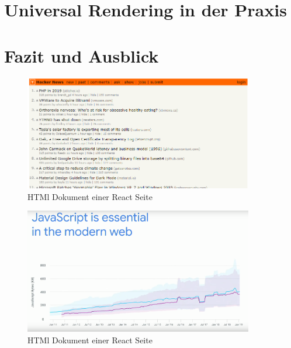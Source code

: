 \documentclass[runningheads]{llncs}
\begin{document}
\newpage

\section{Universal Rendering in der Praxis}
\label{sec:Universal Rendering in der Praxis}

\newpage

\section{Fazit und Ausblick}
\label{sec:Fazit}

\begin{figure}
  \centering
  \includegraphics[width=10cm]{images/HackerNews}
  \caption{HTMl Dokument einer React Seite}
\end{figure}

\begin{figure}
  \centering
  \includegraphics[width=10cm]{images/JavaScriptGoogleShips}
  \caption{HTMl Dokument einer React Seite}
\end{figure}




\newpage
%


\end{document}
